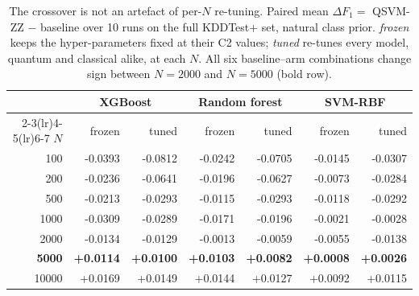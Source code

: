 \begin{table}[t]
\centering
\caption{The crossover is not an artefact of per-$N$ re-tuning. Paired mean
$\Delta F_1 = $ QSVM-ZZ $-$ baseline over 10 runs on the full KDDTest+ set,
natural class prior. \emph{frozen} keeps the hyper-parameters fixed at their
C2 values; \emph{tuned} re-tunes every model, quantum and classical alike, at
each $N$. All six baseline--arm combinations change sign between $N=2000$ and
$N=5000$ (bold row).}
\label{tab:crossover-arms}
\footnotesize
\setlength{\tabcolsep}{4pt}
\begin{tabular}{@{}r rr rr rr@{}}
\toprule
 & \multicolumn{2}{c}{XGBoost} & \multicolumn{2}{c}{Random forest} & \multicolumn{2}{c}{SVM-RBF} \\
\cmidrule(lr){2-3}\cmidrule(lr){4-5}\cmidrule(lr){6-7}
$N$ & frozen & tuned & frozen & tuned & frozen & tuned \\
\midrule
100 & -0.0393 & -0.0812 & -0.0242 & -0.0705 & -0.0145 & -0.0307 \\
200 & -0.0236 & -0.0641 & -0.0196 & -0.0627 & -0.0073 & -0.0284 \\
500 & -0.0213 & -0.0293 & -0.0115 & -0.0293 & -0.0118 & -0.0292 \\
1000 & -0.0309 & -0.0289 & -0.0171 & -0.0196 & -0.0021 & -0.0028 \\
2000 & -0.0134 & -0.0129 & -0.0013 & -0.0059 & -0.0055 & -0.0138 \\
\textbf{5000} & \textbf{+0.0114} & \textbf{+0.0100} & \textbf{+0.0103} & \textbf{+0.0082} & \textbf{+0.0008} & \textbf{+0.0026} \\
10000 & +0.0169 & +0.0149 & +0.0144 & +0.0127 & +0.0092 & +0.0115 \\
\bottomrule
\end{tabular}
\end{table}
